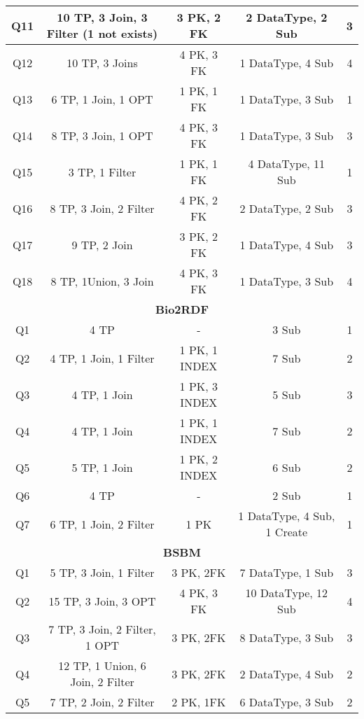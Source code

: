 \begin{table}[th]
{\begin{tabular}{c|c|c|c|c}
Q11 & 10 TP, 3 Join, 3 Filter (1 not exists) & 3 PK, 2 FK & 2 DataType, 2 Sub & 3 \\ \hline
Q12 & 10 TP, 3 Joins & 4 PK, 3 FK & 1 DataType, 4 Sub & 4 \\ \hline
Q13 & 6 TP, 1 Join, 1 OPT & 1 PK, 1 FK & 1 DataType, 3 Sub & 1 \\ \hline
Q14 & 8 TP, 3 Join, 1 OPT & 4 PK, 3 FK & 1 DataType, 3 Sub & 3 \\ \hline
Q15 & 3 TP, 1 Filter & 1 PK, 1 FK & 4 DataType, 11 Sub & 1 \\ \hline
Q16 & 8 TP, 3 Join, 2 Filter & 4 PK, 2 FK & 2 DataType, 2 Sub & 3 \\ \hline
Q17 & 9 TP, 2 Join & 3 PK, 2 FK & 1 DataType, 4 Sub & 3 \\ \hline
Q18 & 8 TP, 1Union, 3 Join & 4 PK, 3 FK & 1 DataType, 3 Sub & 4 \\ \hline
\multicolumn{5}{c}{\textbf{Bio2RDF}} \\ \hline
Q1 & 4 TP & - & 3 Sub & 1 \\ \hline
Q2 & 4 TP, 1 Join, 1 Filter & 1 PK, 1 INDEX & 7 Sub & 2 \\ \hline
Q3 & 4 TP, 1 Join & 1 PK, 3 INDEX & 5 Sub & 3 \\ \hline
Q4 & 4 TP, 1 Join & 1 PK, 1 INDEX & 7 Sub & 2 \\ \hline
Q5 & 5 TP, 1 Join & 1 PK, 2 INDEX & 6 Sub & 2 \\ \hline
Q6 & 4 TP & - & 2 Sub & 1 \\ \hline
Q7 & 6 TP, 1 Join, 2 Filter & 1 PK & 1 DataType, 4 Sub, 1 Create & 1 \\ \hline
\multicolumn{5}{c}{\textbf{BSBM}} \\ \hline
Q1 & 5 TP, 3 Join, 1 Filter & 3 PK, 2FK & 7 DataType, 1 Sub & 3 \\ \hline
Q2 & 15 TP, 3 Join, 3 OPT & 4 PK, 3 FK & 10 DataType, 12 Sub & 4 \\ \hline
Q3 & 7 TP, 3 Join, 2 Filter, 1 OPT & 3 PK, 2FK & 8 DataType, 3 Sub & 3 \\ \hline
Q4 & 12 TP, 1 Union, 6 Join, 2 Filter & 3 PK, 2FK & 2 DataType, 4 Sub & 2 \\ \hline
Q5 & 7 TP, 2 Join, 2 Filter & 2 PK, 1FK & 6 DataType, 3 Sub & 2 \\ \hline

\end{tabular}}
\end{table}
